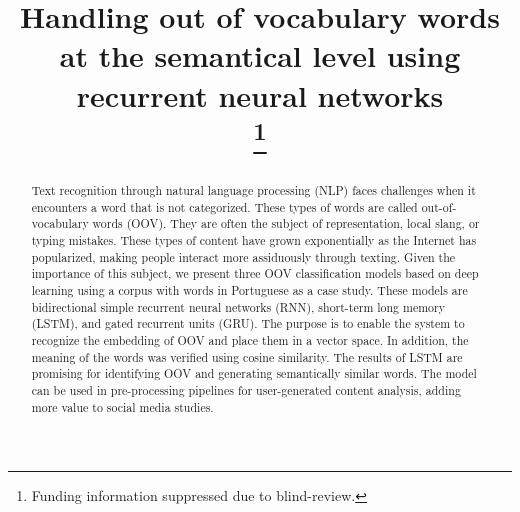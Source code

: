 \documentclass[conference]{IEEEtran}
\begin{document}
\title{Handling out of vocabulary words at the semantical level using recurrent neural networks\\\vspace{0.75cm}
\thanks{Funding information suppressed due to blind-review.}
}

\author{
\and
{}
\and
{}
\and
{
}
}

\maketitle

\begin{abstract}

Text recognition through natural language processing (NLP) faces challenges when it encounters a word that is not categorized. These types of words are called out-of-vocabulary words (OOV). They are often the subject of representation, local slang, or typing mistakes. These types of content have grown exponentially as the Internet has popularized, making people interact more assiduously through texting. Given the importance of this subject, we present three OOV classification models based on deep learning using a corpus with words in Portuguese as a case study. These models are bidirectional simple recurrent neural networks (RNN), short-term long memory (LSTM), and gated recurrent units (GRU). The purpose is to enable the system to recognize the embedding of OOV and place them in a vector space. In addition, the meaning of the words was verified using cosine similarity. The results of LSTM are promising for identifying OOV and generating semantically similar words. The model can be used in pre-processing pipelines for user-generated content analysis, adding more value to social media studies.
\end{abstract}
\end{document}
